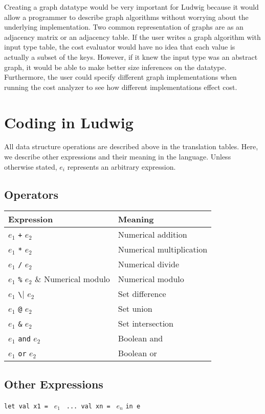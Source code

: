 \documentclass[11pt]{article}
\begin{document}
Creating a graph datatype would be very important for Ludwig because it would allow a programmer to describe graph algorithms without worrying about the underlying implementation. Two common representation of graphs are as an adjacency matrix or an adjacency table. If the user writes a graph algorithm with input type table, the cost evaluator would have no idea that each value is actually a subset of the keys. However, if it knew the input type was an abstract graph, it would be able to make better size inferences on the datatype. Furthermore, the user could specify different graph implementations when running the cost analyzer to see how different implementations effect cost.

\section{Coding in Ludwig}

All data structure operations are described above in the translation tables. Here, we describe other expressions and their meaning in the language. Unless otherwise stated, $e_i$ represents an arbitrary expression.

\subsection{Operators}
\begin{tabular}{| l l |}
\hline
\textbf{Expression} & \textbf{Meaning}\\
\hline
$e_1$ \verb|+| $e_2$ & Numerical addition\\
$e_1$ \verb|*| $e_2$ & Numerical multiplication\\ 
$e_1$ \verb|/| $e_2$ & Numerical divide\\
$e_1$ \verb|%| $e_2$ & Numerical modulo\\ 
$e_1$ \verb|\| $e_2$ & Set difference\\
$e_1$ \verb|@| $e_2$ & Set union\\
$e_1$ \verb|&| $e_2$ & Set intersection\\
$e_1$ \verb|and| $e_2$ & Boolean and\\
$e_1$ \verb|or| $e_2$ & Boolean or\\
\hline
\end{tabular}

\subsection{Other Expressions}
\label{otherexp}
\verb|let val x1 = | $e_1$ \verb| ... val xn = | $e_n$ \verb|in e|\\
\end{document}

